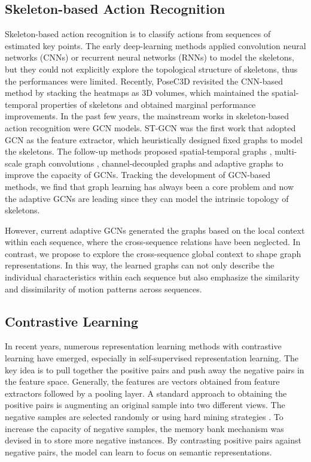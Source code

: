 \documentclass{article} \usepackage{iclr2023_conference,times}
\begin{document}
\subsection{Skeleton-based Action Recognition}
Skeleton-based action recognition is to classify actions from sequences of estimated key points. The early deep-learning methods applied convolution neural networks (CNNs) \citep{PCNN, enhancedcnn} or recurrent neural networks (RNNs) \citep{rnnskeleton,lev2016rnn, twostreamrnn, contextrnn} to model the skeletons, but they could not explicitly explore the topological structure of skeletons, thus the performances were limited. Recently, PoseC3D \citep{posec3d} revisited the CNN-based method by stacking the heatmaps as 3D volumes, which maintained the spatial-temporal properties of skeletons and obtained marginal performance improvements. In the past few years, the mainstream works in skeleton-based action recognition were GCN models. ST-GCN \citep{stgcn} was the first work that adopted GCN as the feature extractor, which heuristically designed fixed graphs to model the skeletons. The follow-up methods proposed spatial-temporal graphs \citep{MSG3D}, multi-scale graph convolutions \citep{MSGCN}, channel-decoupled graphs \citep{CTRGCN, decouplinggcn} and adaptive graphs \citep{ASGCN,2SAGCN,DynamicGCN,CAGCN,CTRGCN,INFOGCN} to improve the capacity of GCNs. Tracking the development of GCN-based methods, we find that graph learning has always been a core problem and now the adaptive GCNs are leading since they can model the intrinsic topology of skeletons.

However, current adaptive GCNs generated the graphs based on the local context within each sequence, where the cross-sequence relations have been neglected. In contrast, we propose to explore the cross-sequence global context to shape graph representations. In this way, the learned graphs can not only describe the individual characteristics within each sequence but also emphasize the similarity and dissimilarity of motion patterns across sequences.

\subsection{Contrastive Learning}
In recent years, numerous representation learning methods \citep{unsupervisedID, oord2018representation,moco,simclr, cross-sequence-semantic} with contrastive learning have emerged, especially in self-supervised representation learning. The key idea is to pull together the  positive pairs and push away the negative pairs in the feature space. Generally, the features are vectors obtained from feature extractors followed by a pooling layer. A standard approach to obtaining the positive pairs is augmenting an original sample into two different views. The negative samples are selected randomly or using hard mining strategies \citep{hard, hard1, hard2}. To increase the capacity of negative samples, the memory bank mechanism was devised in \citep{moco, memorybank} to store more negative instances. By contrasting positive pairs against negative pairs, the model can learn to focus on semantic representations.
\end{document}
